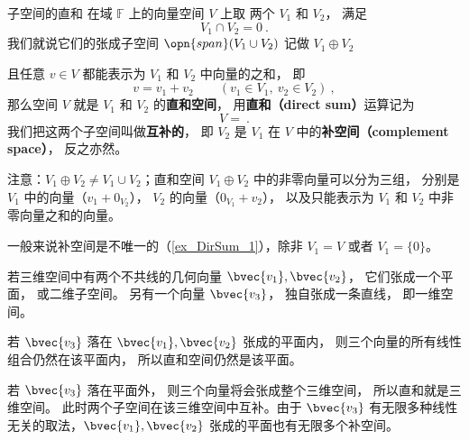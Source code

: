 
\begin{issues}
\issueTODO
{}
\end{issues}



\begin{definition}{子空间的直和}\label{def_DirSum_1}
在域 $\mathbb F$ 上的向量空间 $V$ 上取 两个 $V_1$ 和 $V_2$， 满足
\begin{equation}
V_1 \cap V_2 = \qty{0}~.
\end{equation}
我们就说它们的张成子空间 $\opn{span} (V_1 \cup V_2)$ 记做 $V_1 \oplus V_2$

且任意 ${v} \in V$ 都能表示为 $V_1$ 和 $V_2$ 中向量的之和， 即
\begin{equation}\label{eq_DirSum_2}
v = v_1 + v_2
\qquad
(v_1 \in V_1,\ v_2 \in V_2)~,
\end{equation}
那么空间 $V$ 就是 $V_1$ 和 $V_2$ 的\textbf{直和空间}， 用\textbf{直和（direct sum）}运算记为
\begin{equation}
V = ~.
\end{equation}
我们把这两个子空间叫做\textbf{互补的}， 即 $V_2$ 是 $V_1$ 在 $V$ 中的\textbf{补空间（complement space）}， 反之亦然。
\end{definition}


注意：$V_1 \oplus V_2 \neq V_1 \cup V_2$；直和空间 $V_1 \oplus V_2$ 中的非零向量可以分为三组， 分别是 $V_1$ 中的向量（$v_1 + 0_{V_2}$）， $V_2$ 的向量（$0_{V_1} + v_2$）， 以及只能表示为 $V_1$ 和 $V_2$ 中非零向量之和的向量。

一般来说补空间是不唯一的（\autoref{ex_DirSum_1}），除非 $V_1 = V$ 或者 $V_1 = \{0\}$。

\begin{example}{}\label{ex_DirSum_1}
若三维空间中有两个不共线的几何向量 $\bvec{v_1}, \bvec{v_2}$， 它们张成一个平面， 或二维子空间。 另有一个向量 $\bvec{v_3}$， 独自张成一条直线， 即一维空间。

若 $\bvec{v_3}$ 落在 $\bvec{v_1}, \bvec{v_2}$ 张成的平面内， 则三个向量的所有线性组合仍然在该平面内， 所以直和空间仍然是该平面。

若 $\bvec{v_3}$ 落在平面外， 则三个向量将会张成整个三维空间， 所以直和就是三维空间。 此时两个子空间在该三维空间中互补。由于 $\bvec{v_3}$ 有无限多种线性无关的取法，$\bvec{v_1}, \bvec{v_2}$ 张成的平面也有无限多个补空间。
\end{example}

